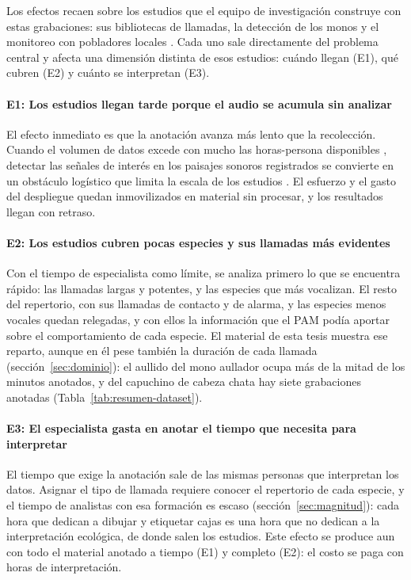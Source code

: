 Los efectos recaen sobre los estudios que el equipo de investigación construye
con estas grabaciones: sus bibliotecas de llamadas, la detección de los monos y
el monitoreo con pobladores locales \citep{wiredamazon_8primates}. Cada uno sale
directamente del problema central y afecta una dimensión distinta de esos
estudios: cuándo llegan (E1), qué cubren (E2) y cuánto se interpretan (E3).

\paragraph{E1: Los estudios llegan tarde porque el audio se acumula sin analizar}
El efecto inmediato es que la anotación avanza más lento que la recolección. Cuando el volumen de datos excede con mucho las horas-persona disponibles
\citep{stowell_computational_2022}, detectar las señales de interés en los
paisajes sonoros registrados se convierte en un obstáculo logístico que limita la
escala de los estudios \citep{Campos_Krofel_Rio-Maior_Renna_2025}. El esfuerzo y
el gasto del despliegue quedan inmovilizados en material sin procesar, y los
resultados llegan con retraso.

\paragraph{E2: Los estudios cubren pocas especies y sus llamadas más evidentes}
Con el tiempo de especialista como límite, se analiza primero lo que se encuentra
rápido: las llamadas largas y potentes, y las especies que más vocalizan. El resto
del repertorio, con sus llamadas de contacto y de alarma, y las especies menos
vocales quedan relegadas, y con ellos la información que el PAM podía aportar
sobre el comportamiento de cada especie. El material de esta tesis muestra ese
reparto, aunque en él pese también la duración de cada llamada
(sección~\ref{sec:dominio}): el aullido del mono aullador ocupa más de la mitad de
los minutos anotados, y del capuchino de cabeza chata hay siete grabaciones
anotadas (Tabla~\ref{tab:resumen-dataset}).

\paragraph{E3: El especialista gasta en anotar el tiempo que necesita para
    interpretar}
El tiempo que exige la anotación sale de las mismas personas que interpretan los
datos. Asignar el tipo de llamada requiere conocer el repertorio de cada especie,
y el tiempo de analistas con esa formación es escaso
(sección~\ref{sec:magnitud}): cada hora que dedican a dibujar y etiquetar cajas
es una hora que no dedican a la interpretación ecológica, de donde salen los
estudios. Este efecto se produce aun con todo el material anotado a tiempo (E1)
y completo (E2): el costo se paga con horas de interpretación.

